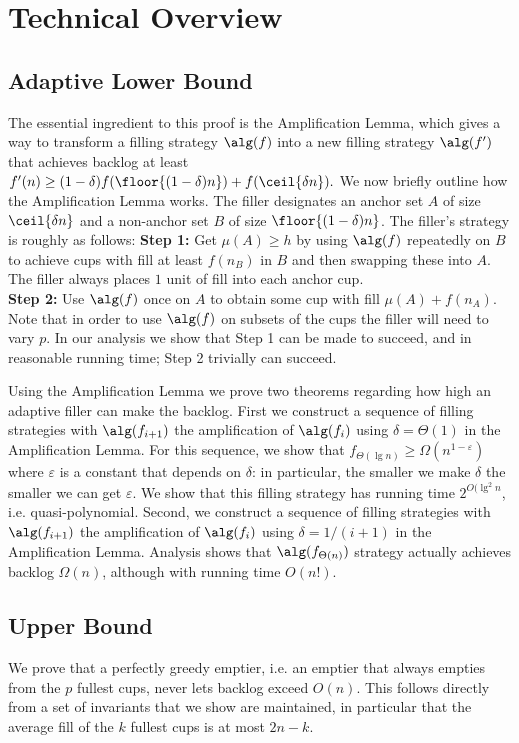 \section{Technical Overview}
\subsection{Adaptive Lower Bound}

The essential ingredient to this proof is the Amplification
Lemma, which gives a way to transform a filling strategy
$\alg(f)$ into a new filling strategy $\alg(f')$ that achieves backlog at
least $f'(n) \ge (1-\delta) f(\floor{(1-\delta)n}) + f(\ceil{\delta n}).$
We now briefly outline how the Amplification Lemma works.
The filler designates an anchor set $A$ of size
$\ceil{\delta n}$ and a non-anchor set $B$ of size
$\floor{(1-\delta)n}$. The filler's strategy is roughly as follows:
\textbf{Step 1:} Get $\mu(A) \ge h$ by using $\alg(f)$ repeatedly
on $B$ to achieve cups with fill at least $f(n_B)$ in $B$ and
then swapping these into $A$. The filler always places $1$ unit
of fill into each anchor cup.\\
\textbf{Step 2:} Use $\alg(f)$ once on $A$ to obtain some cup
with fill $\mu(A)+f(n_A)$.\\
Note that in order to use $\alg(f)$ on subsets of the cups the
filler will need to vary $p$.
In our analysis we show that Step 1 can be made to succeed, and
in reasonable running time; Step 2 trivially can succeed.

Using the Amplification Lemma we prove two theorems regarding how
high an adaptive filler can make the backlog. First we construct
a sequence of filling strategies with $\alg(f_{i+1})$ the
amplification of $\alg(f_i)$ using $\delta = \Theta(1)$ in the
Amplification Lemma. For this sequence, we show that
$f_{\Theta(\lg n)} \ge \Omega(n^{1-\varepsilon})$ where
$\varepsilon$ is a constant that depends on $\delta$: in
particular, the smaller we make $\delta$ the smaller we can get
$\varepsilon$. We show that this filling strategy has running
time $2^{O(\lg^2 n}$, i.e. quasi-polynomial. Second, we construct
a sequence of filling strategies with $\alg(f_{i+1})$ the
amplification of $\alg(f_i)$ using $\delta = 1/(i+1)$ in the
Amplification Lemma. Analysis shows that $\alg(f_{\Theta(n)})$
strategy actually achieves backlog $\Omega(n)$, although with
running time $O(n!)$.

\subsection{Upper Bound}
We prove that a perfectly greedy emptier, i.e. an emptier that
always empties from the $p$ fullest cups, never lets backlog
exceed $O(n)$. 
This follows directly from a set of invariants that we show are
maintained, in particular that the average fill of the $k$ fullest cups
is at most $2n-k$.

